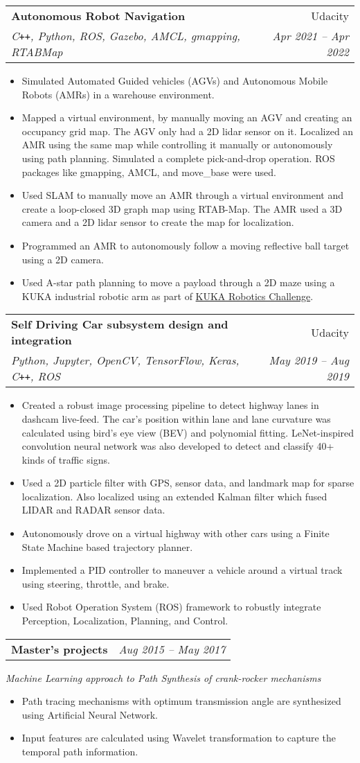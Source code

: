 \documentclass[letterpaper,10pt]{article}
\makeatletter
\newcommand{\resumeHeading}[4]{
  \vspace{-1pt}
    \begin{tabular*}{0.97\textwidth}{l@{\extracolsep{\fill}}r}
      \textbf{#1} & #2 \vspace{-2pt}\\ \vspace{1pt}
      \textit{\small#3} & \textit{\small #4} \\
    \end{tabular*}
}
\newcommand{\resumeSubheading}[1]{
	\vspace{-3pt}
      {\small\textit{#1}} \\
      \vspace{-3pt}
}
\newcommand{\resumeHeadingwithDate}[2]{
	\vspace{-1pt}
	\begin{tabular*}{0.97\textwidth}{l@{\extracolsep{\fill}}r}
		\textbf{#1} &  \textit{\small#2} \vspace{-2pt}\\
	\end{tabular*}
	\vspace{+2pt}
}
\newcommand{\resumeItemListStart}{
\vspace{-7pt}
\begin{itemize}[leftmargin=14pt]
}
\newcommand{\resumeItemListEnd}{
\vspace{+7pt}
\end{itemize}
}
\newcommand{\resumeItem}[1]{
  \item\small{
      {#1 \vspace{-7pt}
      }
  }
}
\makeatother
\begin{document}
\resumeHeading{Autonomous Robot Navigation}{Udacity}{C\texttt{++}, Python, ROS, Gazebo, AMCL, gmapping, RTABMap}{Apr 2021 -- Apr 2022}
\resumeItemListStart
\resumeItem{Simulated Automated Guided vehicles (AGVs) and Autonomous Mobile Robots (AMRs) in a warehouse environment.}
\resumeItem{Mapped a virtual environment, by manually moving an AGV and creating an occupancy grid map. The AGV only had a 2D lidar sensor on it. Localized an AMR using the same map while controlling it manually or autonomously using path planning. Simulated a complete pick-and-drop operation. ROS packages like gmapping, AMCL, and move\_base were used.}
\resumeItem{Used SLAM to manually move an AMR through a virtual environment and create a loop-closed 3D graph map using RTAB-Map. The AMR used a 3D camera and a 2D lidar sensor to create the map for localization.}
\resumeItem{Programmed an AMR to autonomously follow a moving reflective ball target using a 2D camera.}
\resumeItem{Used A-star path planning to move a payload through a 2D maze using a KUKA industrial robotic arm as part of \href{https://www.udacity.com/kuka-robotics-challenge}{KUKA Robotics Challenge}.}
\resumeItemListEnd

\resumeHeading{Self Driving Car subsystem design and integration}{Udacity}{Python, Jupyter, OpenCV, TensorFlow, Keras, C\texttt{++}, ROS}{May 2019 -- Aug 2019}
\resumeItemListStart
\resumeItem{Created a robust image processing pipeline to detect highway lanes in dashcam live-feed. The car's position within lane and lane curvature was calculated using bird's eye view (BEV) and polynomial fitting. LeNet-inspired convolution neural network was also developed to detect and classify 40+ kinds of traffic signs.}
\resumeItem{Used a 2D particle filter with GPS, sensor data, and landmark map for sparse localization. Also localized using an extended Kalman filter which fused LIDAR and RADAR sensor data.}
\resumeItem{Autonomously drove on a virtual highway with other cars using a Finite State Machine based trajectory planner.}
\resumeItem{Implemented a PID controller to maneuver a vehicle around a virtual track using steering, throttle, and brake.}
\resumeItem{Used Robot Operation System (ROS) framework to robustly integrate Perception, Localization, Planning, and Control.}
\resumeItemListEnd

\resumeHeadingwithDate{Master's projects}{Aug 2015 -- May 2017}
\resumeSubheading{Machine Learning approach to Path Synthesis of crank-rocker mechanisms}
\resumeItemListStart
\resumeItem{Path tracing mechanisms with optimum transmission angle are synthesized using Artificial Neural Network.}
\resumeItem{Input features are calculated using Wavelet transformation to capture the temporal path information.}
\resumeItemListEnd
\end{document}
